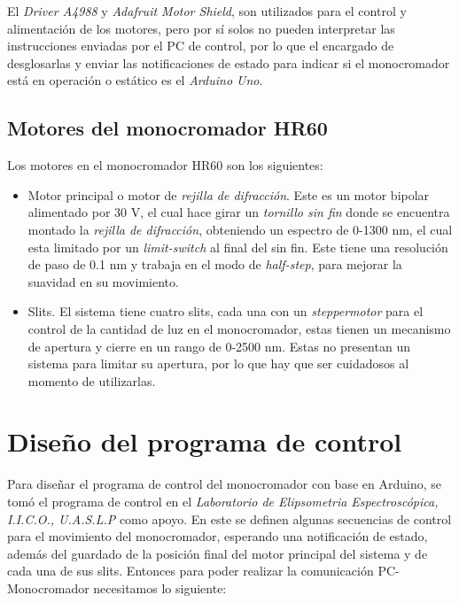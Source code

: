 El \textit{Driver A4988} y \textit{Adafruit Motor Shield}, son utilizados para el control y alimentación de los motores, pero por sí solos no pueden interpretar las instrucciones enviadas por el PC de control, por lo que el encargado de desglosarlas y enviar las notificaciones de estado para indicar si el monocromador está en operación o estático es el \textit{Arduino Uno}.

\subsection{Motores del monocromador HR60}
\label{sec:ch2-motors}

Los motores en el monocromador HR60 son los siguientes:
\begin{itemize}
    \item Motor principal o motor de \textit{rejilla de difracción}. Este es un motor bipolar alimentado por 30 V, el cual hace girar un \textit{tornillo sin fin} donde se encuentra montado la \textit{rejilla de difracción}, obteniendo un espectro de 0-1300 nm, el cual esta limitado por un \textit{limit-switch} al final del sin fin. Este tiene una resolución de paso de 0.1 nm y trabaja en el modo de \textit{half-step}, para mejorar la suavidad en su movimiento.
    \item Slits. El sistema tiene cuatro slits, cada una con un \textit{steppermotor} para el control de la  cantidad de luz en el monocromador, estas tienen un mecanismo de apertura y cierre en un rango de 0-2500 nm. Estas no presentan un sistema para limitar su apertura, por lo que hay que ser cuidadosos al momento de utilizarlas.
\end{itemize}

\section{Diseño del programa de control}
\label{sec:ch2-control}
Para diseñar el programa de control del monocromador con base en Arduino, se tomó el programa de control en el \textit{Laboratorio de Elipsometria Espectroscópica, I.I.C.O., U.A.S.L.P} como apoyo. En este se definen algunas secuencias de control para el movimiento del monocromador, esperando una notificación de estado, además del guardado de la posición final del motor principal del sistema y de cada una de sus slits. Entonces para poder realizar la comunicación PC-Monocromador necesitamos lo siguiente:

